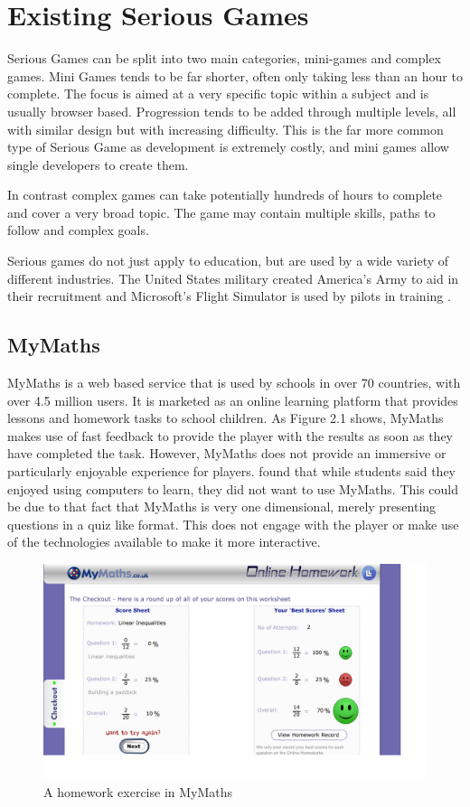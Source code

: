 \documentclass[12pt,a4paper]{report}
\begin{document}
\section{Existing Serious Games}
Serious Games can be split into two main categories, mini-games and complex games. Mini Games tends to be far shorter, often only taking less than an hour to complete. The focus is aimed at a very specific topic within a subject and is usually browser based. Progression tends to be added through multiple levels, all with similar design but with increasing difficulty. This is the far more common type of Serious Game as development is extremely costly, and mini games allow single developers to create them.

In contrast complex games can take potentially hundreds of hours to complete and cover a very broad topic. The game may contain multiple skills, paths to follow and complex goals.  

Serious games do not just apply to education, but are used by a wide variety of different industries. The United States military created America's Army to aid in their recruitment and Microsoft's Flight Simulator is used by pilots in training \citep{111701519980901}.

\subsection{MyMaths}
MyMaths is a web based service that is used by schools in over 70 countries, with over 4.5 million users. It is marketed as an online learning platform that provides lessons and homework tasks to school children.
As Figure 2.1 shows, MyMaths makes use of fast feedback to provide the player with the results as soon as they have completed the task. However, MyMaths does not provide an immersive or particularly enjoyable experience for players. \cite{lee2013learning} found that while students said they enjoyed using computers to learn, they did not want to use MyMaths. This could be due to that fact that MyMaths is very one dimensional, merely presenting questions in a quiz like format. This does not engage with the player or make use of the technologies available to make it more interactive.

\begin{figure}[!tbp]
  \centering
  \begin{minipage}[b]{1\textwidth}
    \includegraphics[width=\textwidth]{mymaths}
    \caption{A homework exercise in MyMaths}
  \end{minipage}
\end{figure}
\FloatBarrier


 
\end{document}
